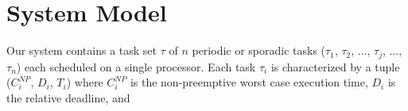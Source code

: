 \section{System Model}\label{sec:system_model}

Our system contains a task set \begin{math}\tau\end{math} of $n$ periodic or sporadic tasks (\begin{math}\tau_{1}\end{math}, \begin{math}\tau_{2}\end{math}, ..., \begin{math}\tau_{j}\end{math}, ..., \begin{math}\tau_{n}\end{math}) each scheduled on a single processor.  Each task \begin{math}\tau_{i}\end{math} is characterized by a tuple (\begin{math}C_{i}^{NP}\end{math}, \begin{math}D_{i}\end{math}, \begin{math}T_{i}\end{math}) where
\begin{math}C_{i}^{NP}\end{math} is the non-preemptive worst case execution time, \begin{math}D_{i}\end{math} is the relative deadline, and
